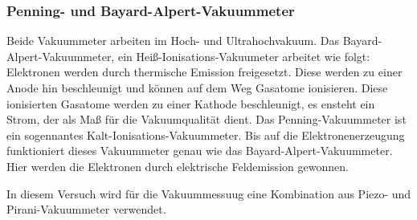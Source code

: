         \subsubsection{Penning- und Bayard-Alpert-Vakuummeter}
            Beide Vakuummeter arbeiten im Hoch- und Ultrahochvakuum.
            Das Bayard-Alpert-Vakuummeter, ein Heiß-Ionisations-Vakuumeter arbeitet wie folgt:\\
            Elektronen werden durch thermische Emission freigesetzt.
            Diese werden zu einer Anode hin beschleunigt und können auf dem Weg Gasatome ionisieren.
            Diese ionisierten Gasatome werden zu einer Kathode beschleunigt, es ensteht ein Strom, der als Maß für die Vakuumqualität dient.
            \noindent
            Das Penning-Vakuummeter ist ein sogennantes Kalt-Ionisations-Vakuummeter.
            Bis auf die Elektronenerzeugung funktioniert dieses Vakuummeter genau wie das Bayard-Alpert-Vakuummeter.
            Hier werden die Elektronen durch elektrische Feldemission gewonnen.

        \noindent
        In diesem Versuch wird für die Vakuummessuug eine Kombination aus Piezo- und Pirani-Vakuummeter verwendet.
